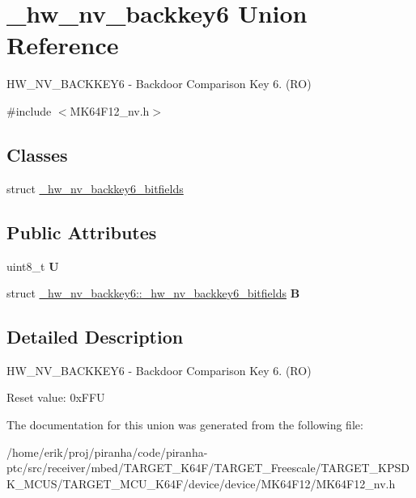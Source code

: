 \hypertarget{union__hw__nv__backkey6}{}\section{\+\_\+hw\+\_\+nv\+\_\+backkey6 Union Reference}
\label{union__hw__nv__backkey6}


H\+W\+\_\+\+N\+V\+\_\+\+B\+A\+C\+K\+K\+E\+Y6 -\/ Backdoor Comparison Key 6. (RO)  




{\ttfamily \#include $<$M\+K64\+F12\+\_\+nv.\+h$>$}

\subsection*{Classes}
\begin{DoxyCompactItemize}
\item 
struct \hyperlink{struct__hw__nv__backkey6_1_1__hw__nv__backkey6__bitfields}{\+\_\+hw\+\_\+nv\+\_\+backkey6\+\_\+bitfields}
\end{DoxyCompactItemize}
\subsection*{Public Attributes}
\begin{DoxyCompactItemize}
\item 
uint8\+\_\+t {\bfseries U}\hypertarget{union__hw__nv__backkey6_ad0a43013684c739820f66b84a887eebb}{}\label{union__hw__nv__backkey6_ad0a43013684c739820f66b84a887eebb}

\item 
struct \hyperlink{struct__hw__nv__backkey6_1_1__hw__nv__backkey6__bitfields}{\+\_\+hw\+\_\+nv\+\_\+backkey6\+::\+\_\+hw\+\_\+nv\+\_\+backkey6\+\_\+bitfields} {\bfseries B}\hypertarget{union__hw__nv__backkey6_ab6cc5065c8f33e4c6c60501dd790dffa}{}\label{union__hw__nv__backkey6_ab6cc5065c8f33e4c6c60501dd790dffa}

\end{DoxyCompactItemize}


\subsection{Detailed Description}
H\+W\+\_\+\+N\+V\+\_\+\+B\+A\+C\+K\+K\+E\+Y6 -\/ Backdoor Comparison Key 6. (RO) 

Reset value\+: 0x\+F\+FU 

The documentation for this union was generated from the following file\+:\begin{DoxyCompactItemize}
\item 
/home/erik/proj/piranha/code/piranha-\/ptc/src/receiver/mbed/\+T\+A\+R\+G\+E\+T\+\_\+\+K64\+F/\+T\+A\+R\+G\+E\+T\+\_\+\+Freescale/\+T\+A\+R\+G\+E\+T\+\_\+\+K\+P\+S\+D\+K\+\_\+\+M\+C\+U\+S/\+T\+A\+R\+G\+E\+T\+\_\+\+M\+C\+U\+\_\+\+K64\+F/device/device/\+M\+K64\+F12/M\+K64\+F12\+\_\+nv.\+h\end{DoxyCompactItemize}
